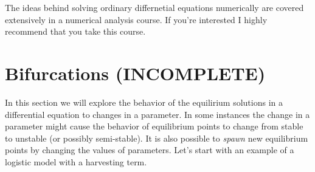 The ideas behind solving ordinary differnetial equations numerically are covered
extensively in a numerical analysis course.  If you're interested I highly recommend that
you take this course.




\section{Bifurcations (INCOMPLETE)}
In this section we will explore the behavior of the equilirium solutions in a differential
equation to changes in a parameter.  In some instances the change in a parameter might
cause the behavior of equilibrium points to change from stable to unstable (or possibly
semi-stable).  It is also possible to {\it spawn} new equilibrium points by changing the
values of parameters.  Let's start with an example of a logistic model with a harvesting
term.


